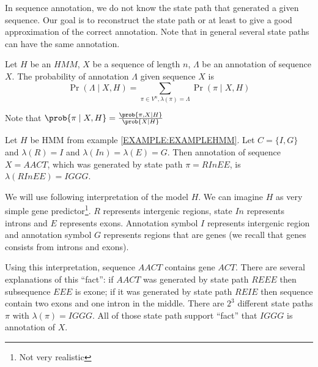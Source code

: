 In sequence annotation, we do not know the state path that generated a given
sequence. Our goal is to reconstruct the state path or at least to give a good
approximation of the correct annotation. Note that in general several state
paths can have the same annotation.


\begin{definition}
Let $H$ be an $HMM$, $X$ be a sequence of length $n$, $\Lambda$ be an annotation of sequence
$X$. The probability of annotation $\Lambda$ given sequence $X$ is 
\begin{equation}
\Pr\left(\Lambda\mid X,H\right)=\sum_{\pi \in V^n,\lambda(\pi) =
\Lambda}\Pr\left(\pi\mid X,H \right)\label{DEF:ANNOTATION:PROBABILITY}
\end{equation}
\end{definition}

Note that $\prob{\pi\mid X,H}=\frac{\prob{\pi,X\mid H}}{\prob{X\mid
H}}$

\begin{example}\label{EXAMPLE:ANNOTATION}
Let $H$ be HMM from example \ref{EXAMPLE:EXAMPLEHMM}. Let $C=\{I,G\}$ and
$\lambda(R)=I$ and $\lambda(In)=\lambda(E)=G$.  Then annotation of sequence
$X=AACT$, which was generated by state path $\pi=RInEE$, is $\lambda(RInEE) =
IGGG$. 

We will use following interpretation of the model $H$. We can imagine $H$ as very simple gene
predictor\footnote{Not very realistic}. $R$ represents intergenic regions, state $In$
represents introns and $E$ represents exons. Annotation symbol $I$ represents
intergenic region and annotation symbol $G$ represents regions that are genes
(we recall that genes consists from introns and exons).

Using this interpretation, sequence $AACT$ contains gene $ACT$. There are
several explanations of this ``fact'': if $AACT$ was generated by state path
$REEE$ then subsequence $EEE$ is exone; if it was generated by state path $REIE$
then sequence contain two exons and one intron in the middle. There are $2^3$
different state paths $\pi$ with $\lambda(\pi)=IGGG$.  All of those state path
support ``fact'' that $IGGG$ is annotation of $X$.

\end{example}



